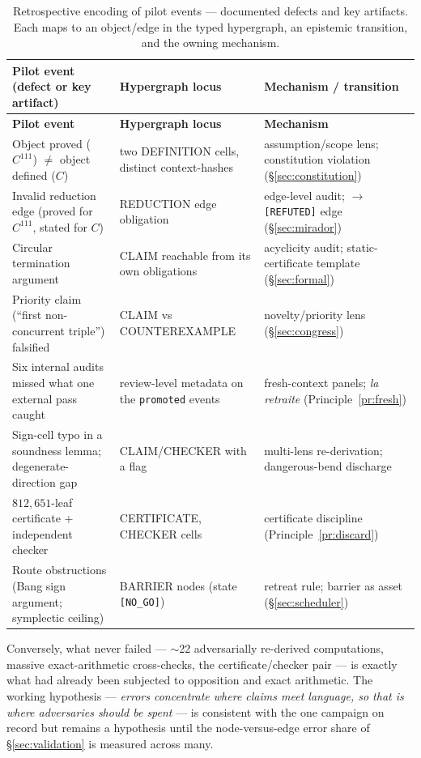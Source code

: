 \documentclass[11pt]{amsart}
\theoremstyle{definition}
\theoremstyle{remark}
\newcommand{\state}[1]{\texttt{[#1]}}
\newcommand{\otype}[1]{\textsc{#1}}
\begin{document}
{\footnotesize
\begin{longtable}{@{}p{}p{}p{}@{}}
\caption{Retrospective encoding of pilot events --- documented defects and key
artifacts. Each maps to an object/edge in the typed hypergraph, an epistemic
transition, and the owning mechanism.}\label{tab:pilot}\\
\toprule
\textbf{Pilot event (defect or key artifact)} & \textbf{Hypergraph
locus} & \textbf{Mechanism / transition}\\ \midrule
\endfirsthead
\toprule
\textbf{Pilot event} & \textbf{Hypergraph locus} & \textbf{Mechanism}\\ \midrule
\endhead
Object proved ($C^{111}$) $\ne$ object defined ($C$) & two \otype{DEFINITION}
cells, distinct context-hashes & assumption/scope lens; constitution violation
(\S\ref{sec:constitution})\\
Invalid reduction edge (proved for $C^{111}$, stated for $C$) &
\otype{REDUCTION} edge obligation & edge-level audit; $\to$\state{REFUTED} edge
(\S\ref{sec:mirador})\\
Circular termination argument & \otype{CLAIM} reachable from its own obligations
& acyclicity audit; static-certificate template (\S\ref{sec:formal})\\
Priority claim (``first non-concurrent triple'') falsified & \otype{CLAIM} vs
\otype{COUNTEREXAMPLE} & novelty/priority lens (\S\ref{sec:congress})\\
Six internal audits missed what one external pass caught & review-level metadata
on the \texttt{promoted} events & fresh-context panels; \emph{la retraite}
(Principle~\ref{pr:fresh})\\
Sign-cell typo in a soundness lemma; degenerate-direction gap &
\otype{CLAIM}/\otype{CHECKER} with a \dbend{} flag & multi-lens re-derivation;
dangerous-bend discharge\\
$812{,}651$-leaf certificate + independent checker & \otype{CERTIFICATE},
\otype{CHECKER} cells & certificate discipline (Principle~\ref{pr:discard})\\
Route obstructions (Bang sign argument; symplectic ceiling) & \otype{BARRIER}
nodes (state \state{NO\_GO}) & retreat rule; barrier as asset
(\S\ref{sec:scheduler})\\
\bottomrule
\end{longtable}
}

Conversely, what never failed --- $\sim$22 adversarially re-derived computations,
massive exact-arithmetic cross-checks, the certificate/checker pair --- is
exactly what had already been subjected to opposition and exact arithmetic. The
working hypothesis --- \emph{errors concentrate where claims meet language, so
that is where adversaries should be spent} --- is consistent with the one
campaign on record but remains a hypothesis until the node-versus-edge error
share of \S\ref{sec:validation} is measured across many.
\end{document}

